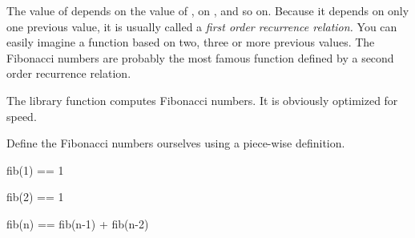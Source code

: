 The value of
 depends on the value of , 
on , and so on.
Because it depends on only one previous value, it is usually called a
{\it first order recurrence relation.}
You can easily imagine a function based on two, three or more previous
values.
The Fibonacci numbers are probably the most famous function defined by a
second order recurrence relation.
\begin{xtc}
\begin{xtccomment}
The library function  computes Fibonacci numbers.
It is obviously optimized for speed.
\end{xtccomment}
\begin{spadsrc}
\end{spadsrc}
\begin{TeXOutput}
\begin{fricasmath}{1}
%
\end{fricasmath}
\end{TeXOutput}
\end{xtc}
\begin{xtc}
\begin{xtccomment}
Define the
Fibonacci numbers ourselves using a piece-wise definition.
\end{xtccomment}
\begin{spadsrc}
fib(1) == 1 
\end{spadsrc}
\end{xtc}
\begin{xtc}
\begin{xtccomment}
\end{xtccomment}
\begin{spadsrc}
fib(2) == 1 
\end{spadsrc}
\end{xtc}
\begin{xtc}
\begin{xtccomment}
\end{xtccomment}
\begin{spadsrc}
fib(n) == fib(n-1) + fib(n-2) 
\end{spadsrc}
\end{xtc}

